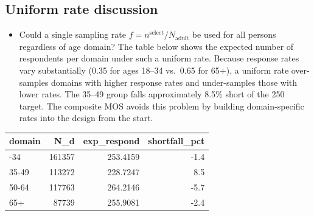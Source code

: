 \documentclass[
  11pt,
]{article}
\newenvironment{Shaded}{\begin{snugshade}}{\end{snugshade}}
\newcommand{\AttributeTok}[1]{\textcolor[rgb]{0.40,0.45,0.13}{#1}}
\newcommand{\DecValTok}[1]{\textcolor[rgb]{0.68,0.00,0.00}{#1}}
\newcommand{\FunctionTok}[1]{\textcolor[rgb]{0.28,0.35,0.67}{#1}}
\newcommand{\NormalTok}[1]{\textcolor[rgb]{0.00,0.23,0.31}{#1}}
\newcommand{\OtherTok}[1]{\textcolor[rgb]{0.00,0.23,0.31}{#1}}
\newcommand{\SpecialCharTok}[1]{\textcolor[rgb]{0.37,0.37,0.37}{#1}}
\providecommand{\tightlist}{%
  \setlength{\itemsep}{0pt}\setlength{\parskip}{0pt}}\usepackage{longtable,booktabs,array}
\begin{document}
\subsection{Uniform rate discussion}\label{uniform-rate-discussion}

\begin{itemize}
\tightlist
\item
  Could a single sampling rate
  \(f = n^{\text{select}} / N_{\text{adult}}\) be used for all persons
  regardless of age domain? The table below shows the expected number of
  respondents per domain under such a uniform rate. Because response
  rates vary substantially (0.35 for ages 18--34 vs.~0.65 for 65+), a
  uniform rate over-samples domains with higher response rates and
  under-samples those with lower rates. The 35--49 group falls
  approximately 8.5\% short of the 250 target. The composite MOS avoids
  this problem by building domain-specific rates into the design from
  the start.
\end{itemize}

\begin{Shaded}
\end{Shaded}

\begin{longtable}[]{@{}lrrr@{}}
\toprule\noalign{}
domain & N\_d & exp\_respond & shortfall\_pct \\
\midrule\noalign{}
\endhead
\bottomrule\noalign{}
\endlastfoot
18-34 & 161357 & 253.4159 & -1.4 \\
35-49 & 113272 & 228.7247 & 8.5 \\
50-64 & 117763 & 264.2146 & -5.7 \\
65+ & 87739 & 255.9081 & -2.4 \\
\end{longtable}
\end{document}
